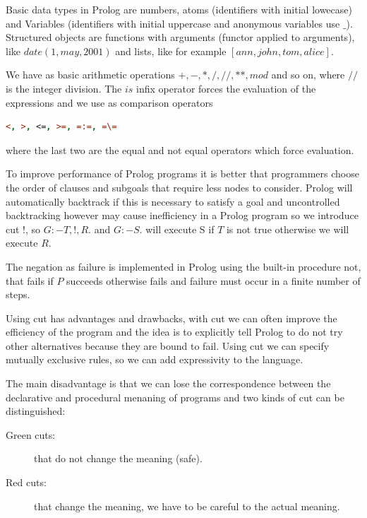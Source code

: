 Basic data types in Prolog are numbers, atoms (identifiers with initial lowecase) and 
Variables (identifiers with initial uppercase and anonymous variables use $\_$).\newline
Structured objects are functions with arguments (functor applied to arguments), like 
$date(1, may, 2001)$ and lists, like for example $[ann, john, tom, alice]$.

We have as basic arithmetic operations $+, -, *, /, //, **, mod$ and so on, where 
$//$ is the integer division.\newline
The $is$ infix operator forces the evaluation of the expressions and we use as comparison
operators 
\begin{lstlisting}[language=Prolog]
<, >, <=, >=, =:=, =\=
\end{lstlisting}
where the last two are the equal and not equal operators which force evaluation.

To improve performance of Prolog programs it is better that programmers choose the order
of clauses and subgoals that require less nodes to consider.\newline
Prolog will automatically backtrack if this is necessary to satisfy a goal and uncontrolled 
backtracking however may cause inefficiency in a Prolog program so we introduce cut $!$, 
so $G:-T, !, R.$ and $G:-S.$ will execute S if $T$ is not true otherwise we will execute $R$.

The negation as failure is implemented in Prolog using the built-in procedure not, that fails
if $P$ succeeds otherwise fails and failure must occur in a finite number of steps.

Using cut has advantages and drawbacks, with cut we can often improve the efficiency of the 
program and the idea is to explicitly tell Prolog to do not try other alternatives because
they are bound to fail.\newline
Using cut we can specify mutually exclusive rules, so we can add expressivity to the language.

The main disadvantage is that we can lose the correspondence between the declarative and 
procedural menaning of programs and two kinds of cut can be distinguished:
\begin{description}
   \item [Green cuts: ] that do not change the meaning (safe).
   \item [Red cuts: ] that change the meaning, we have to be careful to the actual meaning.
\end{description}

